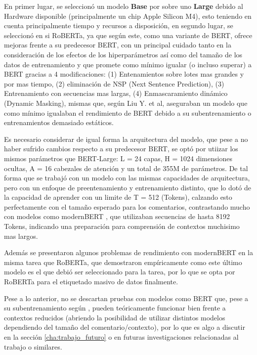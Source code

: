 En primer lugar, se seleccionó un modelo \textbf{Base} por sobre uno \textbf{Large} debido al Hardware disponible (principalmente un chip Apple Silicon M4), esto teniendo en cuenta principalmente tiempo y recursos a disposición, en segundo lugar, se seleccionó en si RoBERTa, ya que según \cite{DBLP:journals/corr/abs-1907-11692} este, como una variante de BERT, ofrece mejoras frente a su predecesor BERT, con un principal cuidado tanto en la consideración de los efectos de los hiperparámetros así como del tamaño de los datos de entrenamiento y que promete como mínimo igualar (o incluso superar) a BERT gracias a 4 modificaciones: (1) Entenamientos sobre lotes mas grandes y por mas tiempo, (2) eliminación de NSP (Next Sentence Prediction), (3) Entrenamiento con secuencias mas largas, (4) Enmascaramiento dinámico (Dynamic Masking), mismas que, según Liu Y. et al, aseguraban un modelo que como mínimo igualaban el rendimiento de BERT debido a su subentrenamiento o entrenamientos demasiado estáticos.   

Es necesario considerar de igual forma la arquitectura del modelo, que pese a no haber sufrido cambios respecto a su predecesor BERT, se optó por utiizar los mismos parámetros que BERT-Large: L = 24 capas, H = 1024 dimensiones ocultas, A = 16 cabezales de atención y un total de 355M de parámetros. De tal forma que se trabajó con un modelo con las mismas capacidades de arquitectura, pero con un enfoque de preentenamiento y entrenamiento distinto, que lo dotó de la capacidad de aprender con un limite de T = 512 (Tokens), calzando esto perfectamente con el tamaño esperado para los comentarios, contrastando mucho con modelos como modernBERT \cite{warner2024modernbert}, que utilizaban secuencias de hasta 8192 Tokens, indicando una preparación para comprensión de contextos muchisimo mas largos.

Además se presentaron algunos problemas de rendimiento con modernBERT en la misma tarea que RoBERTa, que demostraron empíricamente como este último modelo es el que debió ser seleccionado para la tarea, por lo que se opta por RoBERTa para el etiquetado masivo de datos finalmente.

Pese a lo anterior, no se descartan pruebas con modelos como BERT que, pese a su subentrenamiento según \cite{DBLP:journals/corr/abs-1907-11692}, pueden teóricamente funcionar bien frente a contextos reducidos (abriendo la posibilidad de utilizar distintos modelos dependiendo del tamaño del comentario/contexto), por lo que es algo a discutir en la sección \ref{cha:trabajo_futuro} o en futuras investigaciones relacionadas al trabajo o similares.


